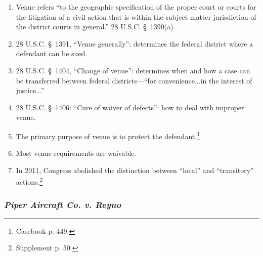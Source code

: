 \begin{enumerate}
    \item Venue refers ``to the geographic specification of the proper court 
    or courts for the litigation of a civil action that is within the subject 
    matter jurisdiction of the district courts in general.'' 28 U.S.C. \S\ 
    1390(a).
    \item 28 U.S.C. \S\ 1391, ``Venue generally'': determines the federal 
    district where a defendant can be sued.
    \item 28 U.S.C. \S\ 1404, ``Change of venue'': determines when and how a 
    case can be transferred between federal districts---``for convenience...in 
    the interest of justice...''
    \item 28 U.S.C. \S\ 1406: ``Cure of waiver of defects'': how to deal with 
    improper venue.
    \item The primary purpose of venue is to protect the 
    defendant.\footnote{Casebook p. 449.}
    \item Most venue requirements are waivable.
    \item In 2011, Congress abolished the distinction between ``local'' and 
    ``transitory'' actions.\footnote{Supplement p. 50.}
\end{enumerate}

\subsubsection{\emph{Piper Aircraft Co. v. Reyno}}

